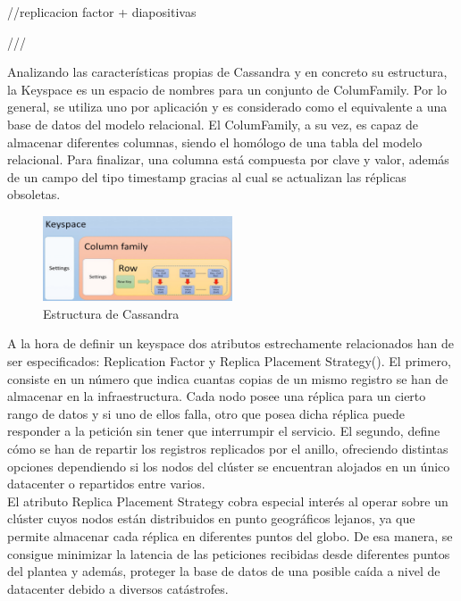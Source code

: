 //replicacion factor + diapositivas

///

Analizando las características propias de Cassandra y en concreto su estructura, la Keyspace es un espacio de nombres para un conjunto de ColumFamily. Por lo general, se utiliza uno por aplicación y es considerado como el equivalente a una base de datos del modelo relacional. El ColumFamily, a su vez, es capaz de almacenar diferentes columnas, siendo el homólogo de una tabla del modelo relacional. Para finalizar, una columna está compuesta por clave y valor, además de un campo del tipo timestamp gracias al cual se actualizan las réplicas obsoletas.\\

\begin{figure}[h]
	\centering
	\includegraphics[width=0.5\textwidth]{Ilustraciones/cassandra_infraestructure.png}
	\caption{Estructura de Cassandra}
	\label{fig:cassandra_infraestructure}
\end{figure}

A la hora de definir un keyspace dos atributos estrechamente relacionados han de ser especificados: Replication Factor y Replica Placement Strategy(). El primero, consiste en un número que indica cuantas copias de un mismo registro se han de almacenar en la infraestructura. Cada nodo posee una réplica para un cierto rango de datos y si uno de ellos falla, otro que posea dicha réplica puede responder a la petición sin tener que interrumpir el servicio. El segundo, define cómo se han de repartir los registros replicados por el anillo, ofreciendo distintas opciones dependiendo si los nodos del clúster se encuentran alojados en un único datacenter o repartidos entre varios.\\

El atributo Replica Placement Strategy cobra especial interés al operar sobre un clúster cuyos nodos están distribuidos en punto geográficos lejanos, ya que permite almacenar cada réplica en diferentes puntos del globo. De esa manera, se consigue minimizar la latencia de las peticiones recibidas desde diferentes puntos del plantea y además, proteger la base de datos de una posible caída a nivel de datacenter debido a diversos catástrofes.\\ 

